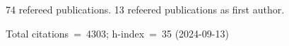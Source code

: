 74 refereed publications. 13 refeered publications as first author.

Total citations~=~4303; h-index~=~35 (2024-09-13)